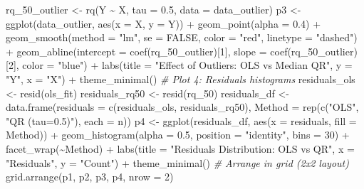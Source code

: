\documentclass[fleqn,8pt]{latex/stylish_article} %
\newenvironment{Shaded}{\begin{snugshade}}{\end{snugshade}}
\newcommand{\DecValTok}[1]{\textcolor[rgb]{0.00,0.00,0.81}{{#1}}}
\newcommand{\FloatTok}[1]{\textcolor[rgb]{0.00,0.00,0.81}{{#1}}}
\newcommand{\ConstantTok}[1]{\textcolor[rgb]{0.00,0.00,0.00}{{#1}}}
\newcommand{\SpecialCharTok}[1]{\textcolor[rgb]{0.00,0.00,0.00}{{#1}}}
\newcommand{\StringTok}[1]{\textcolor[rgb]{0.31,0.60,0.02}{{#1}}}
\newcommand{\CommentTok}[1]{\textcolor[rgb]{0.56,0.35,0.01}{\textit{{#1}}}}
\newcommand{\OtherTok}[1]{\textcolor[rgb]{0.56,0.35,0.01}{{#1}}}
\newcommand{\FunctionTok}[1]{\textcolor[rgb]{0.00,0.00,0.00}{{#1}}}
\newcommand{\AttributeTok}[1]{\textcolor[rgb]{0.77,0.63,0.00}{{#1}}}
\newcommand{\NormalTok}[1]{{#1}}
\begin{document}
\begin{Shaded}
\begin{Highlighting}[]
\NormalTok{rq\_50\_outlier }\OtherTok{\textless{}{-}} \FunctionTok{rq}\NormalTok{(Y }\SpecialCharTok{\textasciitilde{}}\NormalTok{ X, }\AttributeTok{tau =} \FloatTok{0.5}\NormalTok{, }\AttributeTok{data =}\NormalTok{ data\_outlier)}
\NormalTok{p3 }\OtherTok{\textless{}{-}} \FunctionTok{ggplot}\NormalTok{(data\_outlier, }\FunctionTok{aes}\NormalTok{(}\AttributeTok{x =}\NormalTok{ X, }\AttributeTok{y =}\NormalTok{ Y)) }\SpecialCharTok{+} \FunctionTok{geom\_point}\NormalTok{(}\AttributeTok{alpha =} \FloatTok{0.4}\NormalTok{) }\SpecialCharTok{+}
    \FunctionTok{geom\_smooth}\NormalTok{(}\AttributeTok{method =} \StringTok{"lm"}\NormalTok{, }\AttributeTok{se =} \ConstantTok{FALSE}\NormalTok{, }\AttributeTok{color =} \StringTok{"red"}\NormalTok{,}
        \AttributeTok{linetype =} \StringTok{"dashed"}\NormalTok{) }\SpecialCharTok{+} \FunctionTok{geom\_abline}\NormalTok{(}\AttributeTok{intercept =} \FunctionTok{coef}\NormalTok{(rq\_50\_outlier)[}\DecValTok{1}\NormalTok{],}
    \AttributeTok{slope =} \FunctionTok{coef}\NormalTok{(rq\_50\_outlier)[}\DecValTok{2}\NormalTok{], }\AttributeTok{color =} \StringTok{"blue"}\NormalTok{) }\SpecialCharTok{+}
    \FunctionTok{labs}\NormalTok{(}\AttributeTok{title =} \StringTok{"Effect of Outliers: OLS vs Median QR"}\NormalTok{,}
        \AttributeTok{y =} \StringTok{"Y"}\NormalTok{, }\AttributeTok{x =} \StringTok{"X"}\NormalTok{) }\SpecialCharTok{+} \FunctionTok{theme\_minimal}\NormalTok{()}
\CommentTok{\# Plot 4: Residuals histograms}
\NormalTok{residuals\_ols }\OtherTok{\textless{}{-}} \FunctionTok{resid}\NormalTok{(ols\_fit)}
\NormalTok{residuals\_rq50 }\OtherTok{\textless{}{-}} \FunctionTok{resid}\NormalTok{(rq\_50)}
\NormalTok{residuals\_df }\OtherTok{\textless{}{-}} \FunctionTok{data.frame}\NormalTok{(}\AttributeTok{residuals =} \FunctionTok{c}\NormalTok{(residuals\_ols,}
\NormalTok{    residuals\_rq50), }\AttributeTok{Method =} \FunctionTok{rep}\NormalTok{(}\FunctionTok{c}\NormalTok{(}\StringTok{"OLS"}\NormalTok{, }\StringTok{"QR (tau=0.5)"}\NormalTok{),}
    \AttributeTok{each =}\NormalTok{ n))}
\NormalTok{p4 }\OtherTok{\textless{}{-}} \FunctionTok{ggplot}\NormalTok{(residuals\_df, }\FunctionTok{aes}\NormalTok{(}\AttributeTok{x =}\NormalTok{ residuals, }\AttributeTok{fill =}\NormalTok{ Method)) }\SpecialCharTok{+}
    \FunctionTok{geom\_histogram}\NormalTok{(}\AttributeTok{alpha =} \FloatTok{0.5}\NormalTok{, }\AttributeTok{position =} \StringTok{"identity"}\NormalTok{,}
        \AttributeTok{bins =} \DecValTok{30}\NormalTok{) }\SpecialCharTok{+} \FunctionTok{facet\_wrap}\NormalTok{(}\SpecialCharTok{\textasciitilde{}}\NormalTok{Method) }\SpecialCharTok{+} \FunctionTok{labs}\NormalTok{(}\AttributeTok{title =} \StringTok{"Residuals Distribution: OLS vs QR"}\NormalTok{,}
    \AttributeTok{x =} \StringTok{"Residuals"}\NormalTok{, }\AttributeTok{y =} \StringTok{"Count"}\NormalTok{) }\SpecialCharTok{+} \FunctionTok{theme\_minimal}\NormalTok{()}
\CommentTok{\# Arrange in grid (2x2 layout)}
\FunctionTok{grid.arrange}\NormalTok{(p1, p2, p3, p4, }\AttributeTok{nrow =} \DecValTok{2}\NormalTok{)}
\end{Highlighting}
\end{Shaded}
\end{document}
